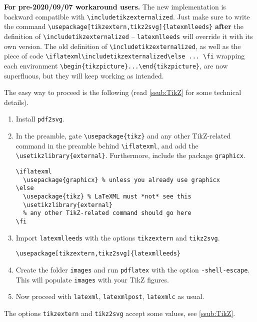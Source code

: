 \documentclass[a4paper]{article}
\def\ltxinline{\lstinline[style=latexml]}
\theoremstyle{definition}
\begin{document}
\textbf{For pre-2020/09/07 workaround users.} The new implementation is backward compatible with \ltxinline|\includetikzexternalized|. Just make sure to write the command \ltxinline|\usepackage[tikzextern,tikz2svg]{latexmlleeds}| \textbf{after} the definition of \ltxinline|\includetikzexternalized| -- \verb|latexmlleeds| will override it with its own version. The old definition of \ltxinline|\includetikzexternalized|, as well as the piece of code \ltxinline|\iflatexml\includetikzexternalized\else ... \fi| wrapping each environment \ltxinline|\begin{tikzpicture}...\end{tikzpicture}|, are now superfluous, but they will keep working as intended.

The easy way to proceed is the following (read \autoref{ssub:TikZ} for some technical details).
\begin{enumerate}
  \item Install \verb|pdf2svg|.
  \item In the preamble, gate \ltxinline|\usepackage{tikz}| and any other TikZ-related command in the preamble behind \ltxinline|\iflatexml|, and add the \ltxinline|\usetikzlibrary{external}|. Furthermore, include the package \verb|graphicx|.
      \begin{lstlisting}[style=latexml]
\iflatexml
  \usepackage{graphicx} % unless you already use graphicx
\else
  \usepackage{tikz} % LaTeXML must *not* see this
  \usetikzlibrary{external}
  % any other TikZ-related command should go here
\fi
      \end{lstlisting}
  \item  Import \ltxinline|latexmlleeds| with the options \ltxinline|tikzextern| and \ltxinline|tikz2svg|.
  \begin{lstlisting}[style=latexml]
\usepackage[tikzextern,tikz2svg]{latexmlleeds}
  \end{lstlisting}
  \item Create the folder \verb|images| and run \verb|pdflatex| with the option \verb|-shell-escape|. This will populate \verb|images| with your TikZ figures.
  \item Now proceed with \verb|latexml|, \verb|latexmlpost|, \verb|latexmlc| as usual.
\end{enumerate}

The options \verb|tikzextern| and \verb|tikz2svg| accept some values, see \autoref{ssub:TikZ}.
\end{document}
